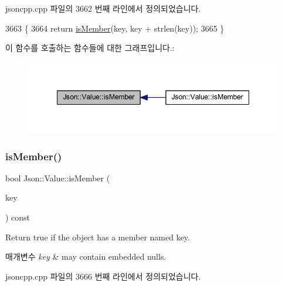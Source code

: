 jsoncpp.\+cpp 파일의 3662 번째 라인에서 정의되었습니다.


\begin{DoxyCode}
3663 \{
3664   \textcolor{keywordflow}{return} \hyperlink{class_json_1_1_value_ad6d4df2227321bab05e86667609a7fad}{isMember}(key, key + strlen(key));
3665 \}
\end{DoxyCode}
이 함수를 호출하는 함수들에 대한 그래프입니다.\+:\nopagebreak
\begin{figure}[H]
\begin{center}
\leavevmode
\includegraphics[width=348pt]{class_json_1_1_value_ad6d4df2227321bab05e86667609a7fad_icgraph}
\end{center}
\end{figure}
\mbox{\label{class_json_1_1_value_a0c2cd838217b23ee6bde8135de1b30d9}} 
\subsubsection{\texorpdfstring{is\+Member()}{isMember()}\hspace{0.1cm}{\footnotesize\ttfamily [2/3]}}
{\footnotesize\ttfamily bool Json\+::\+Value\+::is\+Member (\begin{DoxyParamCaption}\item[{const \hyperlink{json_8h_a1e723f95759de062585bc4a8fd3fa4be}{J\+S\+O\+N\+C\+P\+P\+\_\+\+S\+T\+R\+I\+NG} \&}]{key }\end{DoxyParamCaption}) const}

Return true if the object has a member named key. 
\begin{DoxyParams}{매개변수}
{\em key} & may contain embedded nulls. \\
\hline
\end{DoxyParams}


jsoncpp.\+cpp 파일의 3666 번째 라인에서 정의되었습니다.


